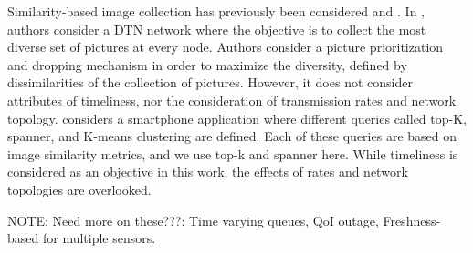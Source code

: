 Similarity-based image collection has previously been considered \cite{photonet} and \cite{mediascope}. In \cite{photonet}, authors consider a DTN network where the objective is to collect the most diverse set of pictures at every node.  Authors consider a picture prioritization and dropping mechanism in order to maximize the diversity, defined by dissimilarities of the collection of pictures. However, it does not consider attributes of timeliness, nor the consideration of transmission rates and network topology.  \cite{mediascope} considers a smartphone application where different queries called top-K, spanner, and K-means clustering are defined.  Each of these queries are based on image similarity metrics, and we use top-k and spanner here. While timeliness is considered as an objective in this work, the effects of rates and network topologies are overlooked.

NOTE:  Need more on these???:  Time varying queues, QoI outage, Freshness-based for multiple sensors.  
